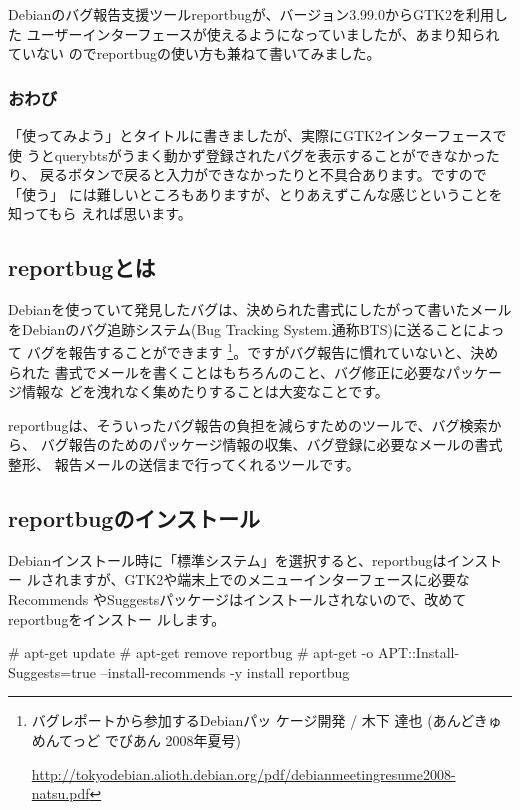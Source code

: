 \documentclass[mingoth,a4paper]{jsarticle}
\begin{document}
Debianのバグ報告支援ツールreportbugが、バージョン3.99.0からGTK2を利用した
ユーザーインターフェースが使えるようになっていましたが、あまり知られていない
のでreportbugの使い方も兼ねて書いてみました。

\subsubsection{おわび}

「使ってみよう」とタイトルに書きましたが、実際にGTK2インターフェースで使
うとquerybtsがうまく動かず登録されたバグを表示することができなかったり、
戻るボタンで戻ると入力ができなかったりと不具合あります。ですので「使う」
には難しいところもありますが、とりあえずこんな感じということを知ってもら
えれば思います。

\subsection{reportbugとは}

Debianを使っていて発見したバグは、決められた書式にしたがって書いたメール
をDebianのバグ追跡システム(Bug Tracking System.通称BTS)に送ることによって
バグを報告することができます \footnote{バグレポートから参加するDebianパッ
ケージ開発 / 木下 達也 (あんどきゅめんてっど でびあん 2008年夏号)

\url{http://tokyodebian.alioth.debian.org/pdf/debianmeetingresume2008-natsu.pdf}}。ですがバグ報告に慣れていないと、決められた
書式でメールを書くことはもちろんのこと、バグ修正に必要なパッケージ情報な
どを洩れなく集めたりすることは大変なことです。

reportbugは、そういったバグ報告の負担を減らすためのツールで、バグ検索から、
バグ報告のためのパッケージ情報の収集、バグ登録に必要なメールの書式整形、
報告メールの送信まで行ってくれるツールです。

\subsection{reportbugのインストール}

Debianインストール時に「標準システム」を選択すると、reportbugはインストー
ルされますが、GTK2や端末上でのメニューインターフェースに必要なRecommends
やSuggestsパッケージはインストールされないので、改めてreportbugをインストー
ルします。

\begin{commandline}
 # apt-get update
 # apt-get remove reportbug
 # apt-get -o APT::Install-Suggests=true --install-recommends -y install reportbug
\end{commandline}
\end{document}
